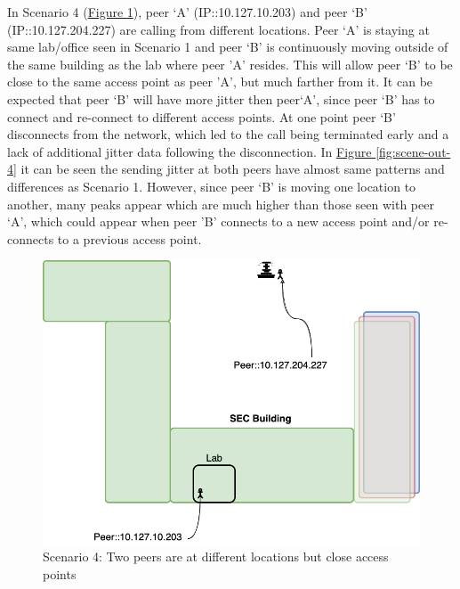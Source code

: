 	In Scenario 4 (\hyperref[fig:scene-4]{Figure \ref{fig:scene-4}}), peer `A' (IP::10.127.10.203) and peer `B' (IP::10.127.204.227) are calling from different locations. Peer `A' is staying at same lab/office seen in Scenario 1 and peer `B' is continuously moving outside of the same building as the lab where peer 'A' resides. This will allow peer `B' to be close to the same access point as peer 'A', but much farther from it. It can be expected that peer `B' will have more jitter then peer`A', since peer `B' has to connect and re-connect to different access points. At one point peer `B' disconnects from the network, which led to the call being terminated early and a lack of additional jitter data following the disconnection. In \hyperref[fig:scene-out-4]{Figure \ref{fig:scene-out-4}} it can be seen the sending jitter at both peers have almost same patterns and differences as Scenario 1. However, since peer `B' is moving one location to another, many peaks appear which are much higher than those seen with peer `A', which could appear when peer 'B' connects to a new access point and/or re-connects to a previous access point.
	\begin{figure}[thb]
		\begin{minipage}{\textwidth}
			\includegraphics[scale=0.29]{Images/experiment/senarios/near_fountain.drawio.png}
		\end{minipage}
		\caption{Scenario 4: Two peers are at different locations but close access points}
		\label{fig:scene-4}
	\end{figure}

